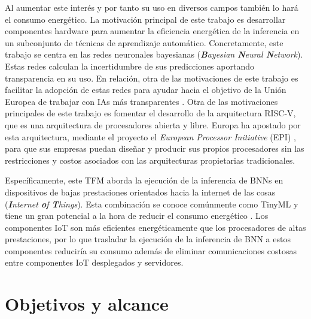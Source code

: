 Al aumentar este interés y por tanto su uso en diversos campos también lo hará el consumo energético. La motivación principal de este trabajo es desarrollar componentes hardware para aumentar la eficiencia energética de la inferencia en un subconjunto de técnicas de aprendizaje automático. Concretamente, este trabajo se centra en las redes neuronales bayesianas (\textit{\textbf{B}ayesian \textbf{N}eural \textbf{N}etwork}). Estas redes calculan la incertidumbre de sus predicciones aportando transparencia en su uso. En relación, otra de las motivaciones de este trabajo es facilitar la adopción de estas redes para ayudar hacia el objetivo de la Unión Europea de trabajar con IAs más transparentes \cite{eu_ai}. Otra de las motivaciones principales de este trabajo es fomentar el desarrollo de la arquitectura RISC-V, que es una arquitectura de procesadores abierta y libre. Europa ha apostado por esta arquitectura, mediante el proyecto el \textit{European Processor Initiative} (EPI) \cite{european_processor}, para que sus empresas puedan diseñar y producir sus propios procesadores sin las restricciones y costos asociados con las arquitecturas propietarias tradicionales. 

Específicamente, este TFM aborda la ejecución de la inferencia de BNNs en dispositivos de bajas prestaciones orientados hacia la internet de las cosas (\textit{\textbf{I}nternet \textbf{o}f \textbf{T}hings}). Esta combinación se conoce comúnmente como TinyML y tiene un gran potencial a la hora de reducir el consumo energético \cite{tinyML_sustainable}. Los componentes IoT son más eficientes energéticamente que los procesadores de altas prestaciones, por lo que trasladar la ejecución de la inferencia de BNN a estos componentes reduciría su consumo además de eliminar comunicaciones costosas entre componentes IoT desplegados y servidores.

\section{Objetivos y alcance}

